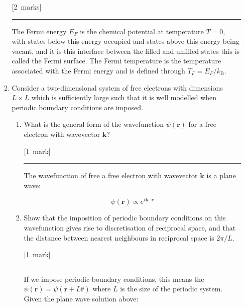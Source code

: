 \documentclass[12pt,a4paper]{article}
\newcommand{\sepline}[0]{\par \hfil\rule{10cm}{0.4pt} \vspace*{\parskip}\hfil}
\begin{document}
\begin{enumerate}
\begin{enumerate}
					\hfill{[2~marks]} %

					\begin{answer}

						\sepline

						The Fermi energy $E_F$ is the chemical potential at temperature $T = 0$, with states below this energy occupied and states above this energy being vacant, and it is this interface between the filled and unfilled states this is called the Fermi surface. The Fermi temperature is the temperature associated with the Fermi energy and is defined through $T_F = E_F / k_\textrm{B}$.
					\end{answer}

					\item Consider a two-dimensional system of free electrons with dimensions $L \times L$ which is sufficiently large such that it is well modelled when periodic boundary conditions are imposed.

					\begin{enumerate}
						\item What is the general form of the wavefunction $\psi(\mathbf{r})$ for a free electron with wavevector $\mathbf{k}$?

						\hfill{[1~mark]}

						\begin{answer}

							\sepline

							The wavefunction of free a free electron with wavevector $\mathbf{k}$ is a plane wave:

							$$ \psi(\mathbf{r}) \propto e^{i \mathbf{k} \cdot \mathbf{r}} $$

						\end{answer}

						\item Show that the imposition of periodic boundary conditions on this wavefunction gives rise to discretisation of reciprocal space, and that the distance between nearest neighbours in reciprocal space is $2\pi/L$.

						\hfill{[1~mark]}

						\begin{answer}

							\sepline

							If we impose periodic boundary conditions, this means the $\psi(\mathbf{r}) = \psi(\mathbf{r} + L\hat{\mathbf{r}})$ where $L$ is the size of the periodic system. Given the plane wave solution above:


\end{answer}
\end{enumerate}
\end{enumerate}
\end{enumerate}
\end{document}
